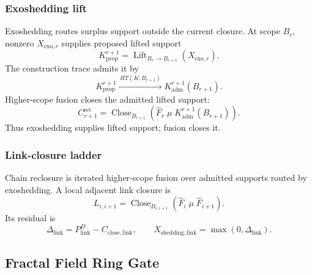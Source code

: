 \subsubsection{Exoshedding lift}
\label{subsec:exoshedding-lift}
Exoshedding routes surplus support outside the current closure. At scope \(B_r\), nonzero \(X_{\mathrm{exo},r}\) supplies proposed lifted support
\begin{equation}
K^{r+1}_{\mathrm{prop}}
=
\operatorname{Lift}_{B_r\to B_{r+1}}
\left(X_{\mathrm{exo},r}\right).
\label{eq:exoshedding-lift}
\end{equation}
The construction trace admits it by
\begin{equation}
K^{r+1}_{\mathrm{prop}}
\xrightarrow{\,HT(K;B_{r+1})\,}
K^{r+1}_{\mathrm{adm}}(B_{r+1}).
\label{eq:lifted-support-admission}
\end{equation}
Higher-scope fusion closes the admitted lifted support:
\begin{equation}
C^{\mathrm{ret}}_{r+1}
=
\operatorname{Close}_{B_{r+1}}
\left(
\widehat F_r\;\mu\;K^{r+1}_{\mathrm{adm}}(B_{r+1})
\right).
\label{eq:higher-scope-fusion}
\end{equation}
Thus exoshedding supplies lifted support; fusion closes it.

\subsubsection{Link-closure ladder}
\label{subsec:link-closure-ladder}
Chain reclosure is iterated higher-scope fusion over admitted supports routed by exoshedding. A local adjacent link closure is
\begin{equation}
L_{i,i+1}
=
\operatorname{Close}_{B_{i,i+1}}
\left(
\widehat F_i\;\mu\;\widehat F_{i+1}
\right).
\label{eq:link-closure-ladder}
\end{equation}
Its residual is
\begin{equation}
\Delta_{\mathrm{link}}=P^D_{\mathrm{link}}-C_{\mathrm{close,link}},
\qquad
X_{\mathrm{shedding},\mathrm{link}}=\max(0,\Delta_{\mathrm{link}}).
\label{eq:link-closure-residual}
\end{equation}



\subsection{Fractal Field Ring Gate}
\label{subsec:fractal-field-ring-gate}

